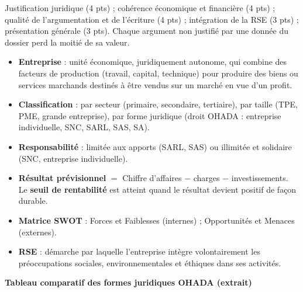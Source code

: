 \documentclass[11pt]{article}
\newcounter{popsec}
\newcounter{popsub}
\newcommand{\courssub}[1]{%
  \stepcounter{popsub}%
  \par\vspace{9pt}\noindent{\popxbold\fontsize{11.5}{13}\selectfont\color{popink}{\color{poporange}\thepopsec.\thepopsub}\hspace{6pt}#1}\par\nopagebreak\vspace{4pt}
}
\begin{document}
\begin{attention}
Justification juridique (4 pts) ; cohérence économique et financière (4 pts) ; qualité de l'argumentation et de l'écriture (4 pts) ; intégration de la RSE (3 pts) ; présentation générale (3 pts). Chaque argument non justifié par une donnée du dossier perd la moitié de sa valeur.
\end{attention}

\courssub{Ressources à mobiliser}

\begin{aretenir}
\begin{itemize}
\item \textbf{Entreprise} : unité économique, juridiquement autonome, qui combine des facteurs de production (travail, capital, technique) pour produire des biens ou services marchands destinés à être vendus sur un marché en vue d'un profit.
\item \textbf{Classification} : par secteur (primaire, secondaire, tertiaire), par taille (TPE, PME, grande entreprise), par forme juridique (droit OHADA : entreprise individuelle, SNC, SARL, SAS, SA).
\item \textbf{Responsabilité} : limitée aux apports (SARL, SAS) ou illimitée et solidaire (SNC, entreprise individuelle).
\item \textbf{Résultat prévisionnel} $=$ Chiffre d'affaires $-$ charges $-$ investissements. Le \textbf{seuil de rentabilité} est atteint quand le résultat devient positif de façon durable.
\item \textbf{Matrice SWOT} : Forces et Faiblesses (internes) ; Opportunités et Menaces (externes).
\item \textbf{RSE} : démarche par laquelle l'entreprise intègre volontairement les préoccupations sociales, environnementales et éthiques dans ses activités.
\end{itemize}

\textbf{Tableau comparatif des formes juridiques OHADA (extrait)}


\end{aretenir}
\end{document}
